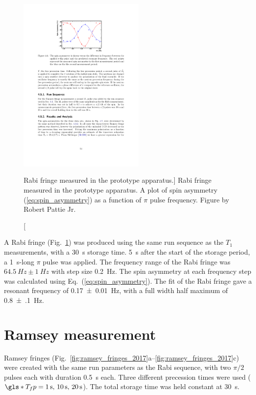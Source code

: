 \begin{figure}
    \centering
    \includegraphics[width=0.55\textwidth]{figures/2017_rabi_fringe.pdf}
    \caption
    [Rabi fringe measured in the prototype apparatus.]
    {Rabi fringe measured in the prototype apparatus. A plot of spin asymmetry (\ref{eq:spin_asymmetry}) as a function of $\pi$ pulse frequency. Figure by Robert Pattie Jr.}
    \label{fig:rabi_fringe_2017}
\end{figure}

A Rabi fringe (Fig.~\ref{fig:rabi_fringe_2017}) was produced using the same run sequence as the $T_1$ measurements, with a \qty{30}{\second} storage time. \qty{5}{\second} after the start of the storage period, a \qty{1}{\second}-long $\pi$ pulse was applied. The frequency range of the Rabi fringe was $\qty{64.5}{Hz} \pm \qty{1}{Hz}$ with step size \qty{0.2}{Hz}. The spin asymmetry at each frequency step was calculated using Eq.~(\ref{eq:spin_asymmetry}). The fit of the Rabi fringe gave a resonant frequency of \qty{0.17(1)}{Hz}, with a full width half maximum of \qty{0.8(1)}{Hz}.


\section{Ramsey measurement}\label{sec:2017_ramsey_measurement}


Ramsey fringes (Fig.~\ref{fig:ramsey_fringes_2017}a--\ref{fig:ramsey_fringes_2017}c) were created with the same run parameters as the Rabi sequence, with two $\pi/2$ pulses each with duration \qty{0.5}{s} each. Three different precession times were used ($\gls*{T_fp}=\qty{1}{s},\,\qty{10}{s},\,\qty{20}{s}$). The total storage time was held constant at \qty{30}{\second}.


